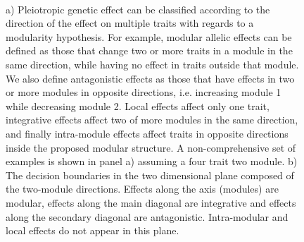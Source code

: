\begin{refsection}
\begin{figure}
    \centering
     \\
    \caption[Pleiotropic vector classification]{a) Pleiotropic genetic effect can be classified according to the direction of the effect on multiple traits with regards to a modularity hypothesis. For example, modular allelic effects can be defined as those that change two or more traits in a module in the same direction, while having no effect in traits outside that module. We also define antagonistic effects as those that have effects in two or more modules in opposite directions, i.e. increasing module 1 while decreasing module 2. Local effects affect only one trait, integrative effects affect two of more modules in the same direction, and finally intra-module effects affect traits in opposite directions inside the proposed modular structure. A non-comprehensive set of examples is shown in panel a) assuming a four trait two module. b) The decision boundaries in the two dimensional plane composed of the two-module directions. Effects along the axis (modules) are modular, effects along the main diagonal are integrative and effects along the secondary diagonal are antagonistic. Intra-modular and local effects do not appear in this plane.}
    \label{effectclassification}
\end{figure}



\end{refsection}
